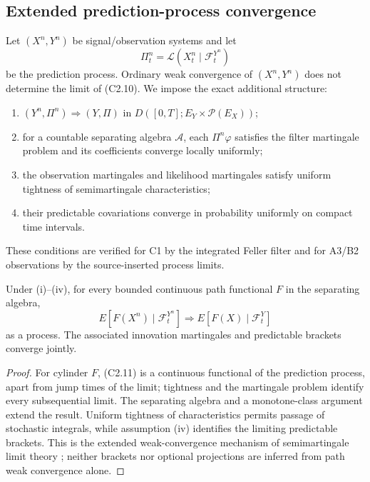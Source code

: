 \subsection{Extended prediction-process convergence}

Let $(X^n,Y^n)$ be signal/observation systems and let
\[
 \Pi_t^n=\mathcal L(X_t^n\mid\mathcal F_t^{Y^n})          \tag{C2.10}
\]
be the prediction process.  Ordinary weak convergence of $(X^n,Y^n)$ does not
determine the limit of (C2.10).  We impose the exact additional structure:
\begin{enumerate}[label=(\roman*)]
\item $(Y^n,\Pi^n)\Rightarrow(Y,\Pi)$ in
$D([0,T];E_Y\times\mathcal P(E_X))$;
\item for a countable separating algebra $\mathcal A$, each
$\Pi^n\varphi$ satisfies the filter martingale problem and its coefficients
converge locally uniformly;
\item the observation martingales and likelihood martingales satisfy uniform
tightness of semimartingale characteristics;
\item their predictable covariations converge in probability uniformly on
compact time intervals.
\end{enumerate}
These conditions are verified for C1 by the integrated Feller filter and for
A3/B2 observations by the source-inserted process limits.

\begin{theorem}
\label{thm:r23-c2-optional}
Under (i)--(iv), for every bounded continuous path functional $F$ in the
separating algebra,
\[
 E[F(X^n)\mid\mathcal F_t^{Y^n}]
 \Rightarrow E[F(X)\mid\mathcal F_t^Y]                   \tag{C2.11}
\]
as a process.  The associated innovation martingales and predictable brackets
converge jointly.
\end{theorem}

\begin{proof}
For cylinder $F$, (C2.11) is a continuous functional of the prediction
process, apart from jump times of the limit; tightness and the martingale
problem identify every subsequential limit.  The separating algebra and a
monotone-class argument extend the result.  Uniform tightness of
characteristics permits passage of stochastic integrals, while assumption
(iv) identifies the limiting predictable brackets.  This is the extended
weak-convergence mechanism of semimartingale limit theory
\cite{JacodShiryaev2003,KurtzProtter1991}; neither brackets nor optional
projections are inferred from path weak convergence alone.
\end{proof}


